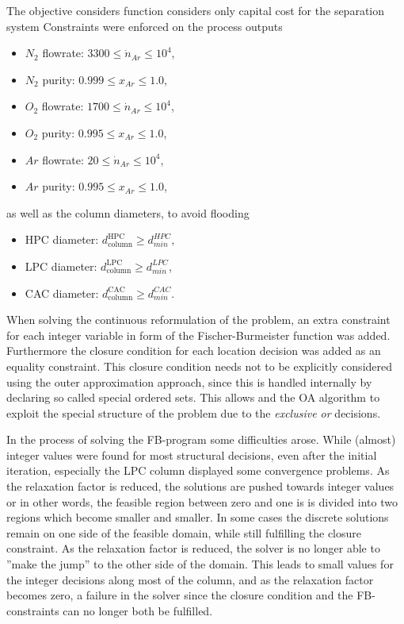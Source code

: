     The objective considers function considers only capital cost for the separation system 
    Constraints were enforced on the process outputs
    \begin{itemize}
        \item $N_2$ flowrate: $ 3300 \leq \dot{n}_{Ar} \leq 10^4 $,
        \item $N_2$ purity: $0.999 \leq x_{Ar} \leq 1.0 $,
        \item $O_2$ flowrate: $ 1700 \leq \dot{n}_{Ar} \leq 10^4 $,
        \item $O_2$ purity: $0.995 \leq x_{Ar} \leq 1.0 $,
        \item $Ar$ flowrate: $ 20 \leq \dot{n}_{Ar} \leq 10^4 $,
        \item $Ar$ purity: $0.995 \leq x_{Ar} \leq 1.0 $,
    \end{itemize}
    as well as the column diameters, to avoid flooding
    \begin{itemize}
        \item HPC diameter: $d_{\text{column}}^{\text{HPC}} \geq d_{min}^{HPC}$, 
        \item LPC diameter: $d_{\text{column}}^{\text{LPC}} \geq d_{min}^{LPC}$, 
        \item CAC diameter: $d_{\text{column}}^{\text{CAC}} \geq d_{min}^{CAC}$.
    \end{itemize}
    When solving the continuous reformulation of the problem, an extra constraint for each integer variable in form of the
    Fischer-Burmeister function was added. Furthermore the closure condition for each location decision was added as
    an equality constraint. This closure condition needs not to be explicitly considered using the outer approximation approach,
    since this is handled internally by declaring so called special ordered sets. This allows \gproms and the OA algorithm
    to exploit the special structure of the problem due to the \emph{exclusive or} decisions.

    In the process of solving the FB-program  some difficulties arose. While
    (almost) integer values were found for most structural decisions, even after the initial iteration, especially
    the LPC column displayed some convergence problems. As the relaxation factor is reduced, the solutions are pushed
    towards integer values or in other words, the feasible region between zero and one is is divided into two regions which become
    smaller and smaller. In some cases the discrete solutions remain on one side of the feasible domain, while still fulfilling
    the closure constraint. As the relaxation factor is reduced, the solver is no longer able to ''make the jump'' to the other side
    of the domain. This leads to small values for the integer decisions along most of the column, and as the relaxation factor becomes zero,
    a failure in the solver since the closure condition and the FB-constraints can no longer both be fulfilled.

